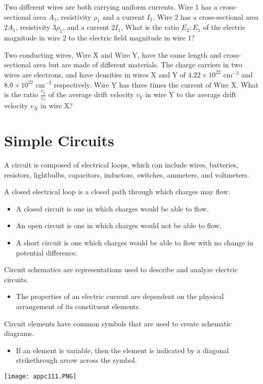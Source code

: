\documentclass[../em.tex]{subfiles}
\begin{document}
\ex Two different wires are both carrying uniform currents. Wire 1 has a cross-sectional area $A_1$, resistivity $\rho_1$ and a current $I_1$. Wire 2 has a cross-sectional area $2A_1$, resistivity $3\rho_1$,
and a current $2I_1$. What is the ratio $E_2:E_1$ of the electric magnitude in wire 2 to the electric field magnitude in wire 1?

\ex Two conducting wires, Wire X and Wire Y, have the same length and cross-sectional area but are made of different materials. The charge carriers in two wires are electrons, and have densities in wires X and Y of 
$4.22\times 10^{22}$ cm$^{-3}$ and $8.0\times 10^{22}$ cm$^{-3}$ respectively. Wire Y has three times the current of Wire X. What is the ratio $\frac{v_y}{v_x}$ of the average drift velocity $v_Y$ in wire Y to the average drift velocity $v_X$ in wire X?

\section{Simple Circuits}
A circuit is composed of electrical loops, which can include wires, batteries, resistors, 
lightbulbs, capacitors, inductors, switches, ammeters, and voltmeters.

A closed electrical loop is a closed path through which charges may flow.
\begin{itemize}
    \item A closed circuit is one in which charges would be able to flow.
    \item An open circuit is one in which charges would not be able to flow.
    \item A short circuit is one which charges would be able to flow with no change in potential difference.
\end{itemize}

Circuit schematics are representations used to describe and analyze electric circuits.
\begin{itemize}
    \item The properties of an electric current are dependent on the physical arrangement of its constituent elements.
\end{itemize}
Circuit elements have common symbols that are used to create schematic diagrams.
\begin{itemize}
    \item If an element is variable, then the element is indicated by a diagonal strikethrough arrow across the symbol.
\end{itemize}
\begin{center}
    \texttt{[image: appc111.PNG]}
\end{center}
\end{document}
